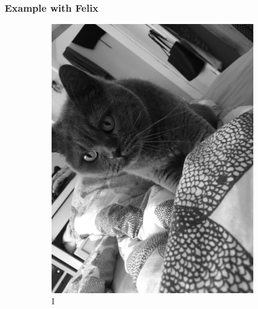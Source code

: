 \begin{frame}
	\frametitle{Example with Felix}
	\begin{figure}
		\centering
		\begin{subfigure}[b]{0.175\textwidth}
			\centering
			\includegraphics[width=\textwidth]{images/Kadse}
			\caption[I]%
			{{\small I}}    
			\label{fig:RawFelix}
		\end{subfigure}
		\quad
		\begin{subfigure}[b]{0.175\textwidth}  
			\centering 

\end{subfigure}
\end{figure}
\end{frame}
